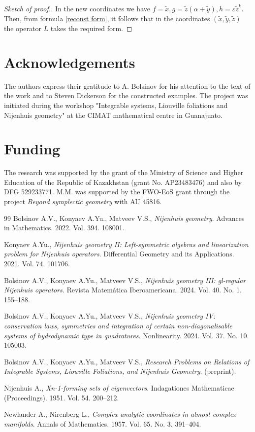 \documentclass[12pt]{article}
\theoremstyle{plain}
\begin{document}
\begin{proof}[Sketch of proof.]
In the new coordinates we have $f=\tilde x,
g=\tilde z(\alpha+\tilde y),
h=\varepsilon\tilde z^k.$ Then, from formula \eqref{reconst form}, it follows that in the coordinates $(\tilde x,\tilde y,\tilde z)$ the operator \(L\) takes the required form.
\end{proof}

\section*{Acknowledgements}
The authors express their gratitude to A. Bolsinov for his attention to the text of the work and to Steven Dickerson for the constructed examples. The project was initiated during the workshop "Integrable systems, Liouville foliations and Nijenhuis geometry" at the CIMAT mathematical centre in Guanajuato.

\section*{Funding}
The research was supported by the grant of the Ministry of Science and Higher Education of the Republic of Kazakhstan (grant No. AP23483476) and also by DFG 529233771. M.M. was supported by the FWO-EoS grant through the project \textit{Beyond symplectic geometry} with AU 45816.

\begin{thebibliography}{99}
    Bolsinov A.V., Konyaev A.Yu., Matveev V.S., \emph{Nijenhuis geometry}. Advances in Mathematics. 2022. Vol. 394. 108001.

Konyaev A.Yu., \emph{Nijenhuis geometry II: Left-symmetric algebras and linearization problem for Nijenhuis operators}. Differential Geometry and its Applications. 2021. Vol. 74. 101706.

Bolsinov A.V., Konyaev A.Yu., Matveev V.S., \emph{Nijenhuis geometry III: gl-regular Nijenhuis operators}. Revista Matemática Iberoamericana. 2024. Vol. 40. No. 1. 155--188.

Bolsinov A.V., Konyaev A.Yu., Matveev V.S., \emph{Nijenhuis geometry IV: conservation laws, symmetries and integration of certain non-diagonalisable systems of hydrodynamic type in quadratures}. Nonlinearity. 2024. Vol. 37. No. 10. 105003.

Bolsinov A.V., Konyaev A.Yu., Matveev V.S., \emph{Research Problems on Relations of Integrable Systems, Liouville Foliations, and Nijenhuis Geometry}. (preprint).

Nijenhuis A., \emph{Xn-1-forming sets of eigenvectors}. Indagationes Mathematicae (Proceedings). 1951. Vol. 54. 200--212.

Newlander A., Nirenberg L., \emph{Complex analytic coordinates in almost complex manifolds}. Annals of Mathematics. 1957. Vol. 65. No. 3. 391--404.
\end{thebibliography}
\end{document}
